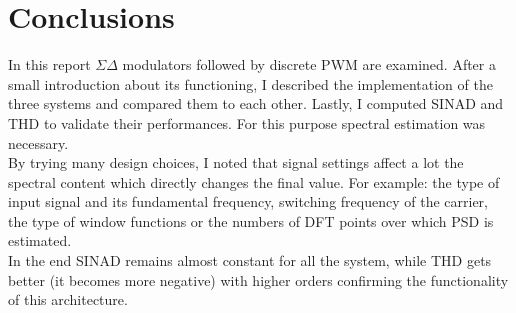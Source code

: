 \documentclass[11pt,a4paper]{article}
\begin{document}

\section{Conclusions}
In this report $\Sigma\Delta$ modulators followed by discrete PWM are examined. After a small introduction about its functioning, I described the implementation of the three systems and compared them to each other.
Lastly, I computed SINAD and THD to validate their performances. For this purpose spectral estimation was necessary. \\
By trying many design choices, I noted that signal settings affect a lot the spectral content which directly changes the final value. For example: the type of input signal and its fundamental frequency, switching frequency of the carrier, the type of window functions or the numbers of DFT points over which PSD is estimated.\\
In the end SINAD remains almost constant for all the system, while THD gets better (it becomes more negative) with higher orders confirming the functionality of this architecture. 

 
\footnotesize
\newpage
\hypersetup{linkcolor = black}
\listoffigures
\listoftables


\end{document}

